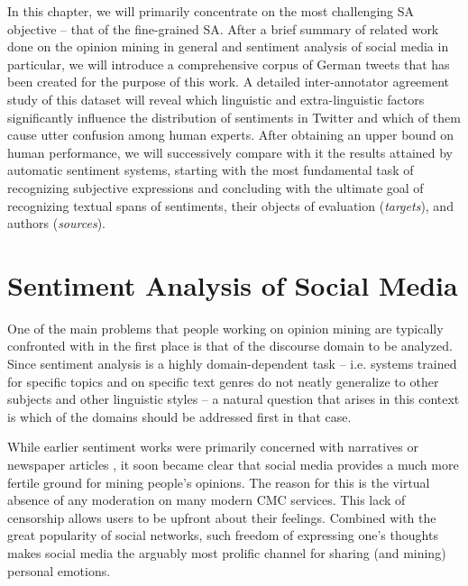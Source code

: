 In this chapter, we will primarily concentrate on the most challenging
SA objective -- that of the fine-grained SA.  After a brief summary of
related work done on the opinion mining in general and sentiment
analysis of social media in particular, we will introduce a
comprehensive corpus of German tweets that has been created for the
purpose of this work.  A detailed inter-annotator agreement study of
this dataset will reveal which linguistic and extra-linguistic factors
significantly influence the distribution of sentiments in Twitter and
which of them cause utter confusion among human experts.  After
obtaining an upper bound on human performance, we will successively
compare with it the results attained by automatic sentiment systems,
starting with the most fundamental task of recognizing subjective
expressions and concluding with the ultimate goal of recognizing
textual spans of sentiments, their objects of evaluation
(\emph{targets}), and authors (\emph{sources}).


\section{Sentiment Analysis of Social Media}

One of the main problems that people working on opinion mining are
typically confronted with in the first place is that of the discourse
domain to be analyzed.  Since sentiment analysis is a highly
domain-dependent task \citep[cf.][]{Aue:05,Blitzer:07,Li:08} --
i.e. systems trained for specific topics and on specific text genres
do not neatly generalize to other subjects and other linguistic styles
-- a natural question that arises in this context is which of the
domains should be addressed first in that case.

While earlier sentiment works were primarily concerned with narratives
\citep{Wiebe:90a,Wiebe:94} or newspaper articles
\citep{Wiebe:03,Wiebe:05,Bautin:08}, it soon became clear that social
media provides a much more fertile ground for mining people's
opinions.  The reason for this is the virtual absence of any
moderation on many modern CMC services.  This lack of censorship
allows users to be upfront about their feelings.  Combined with the
great popularity of social networks, such freedom of expressing one's
thoughts makes social media the arguably most prolific channel for
sharing (and mining) personal emotions.

